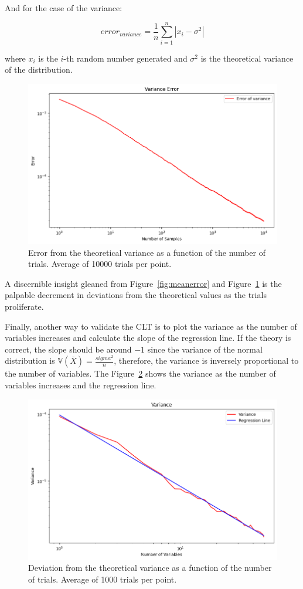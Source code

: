 \documentclass{article}
\begin{document}
And for the case of the variance:

\begin{equation*} error_{variance} = \frac{1}{n}\sum_{i=1}^{n} | x_i - \sigma^2 | \end{equation*}

where \(x_i\) is the \(i\)-th random number generated and \(\sigma^2\) is the theoretical variance of the distribution.

\begin{figure}[H]
	\centering
	\includegraphics[width=0.5\linewidth]{./Figures/CLT/varianceerror.png}
	\caption{Error from the theoretical variance as a function of the number of trials. Average of 10000 trials per point.}
	\label{fig:varianceerror}
\end{figure}

A discernible insight gleaned from Figure~\ref{fig:meanerror} and Figure~\ref{fig:varianceerror} is the palpable decrement in deviations from the theoretical values as the trials proliferate. 

Finally, another way to validate the CLT is to plot the variance as the number of variables increases and calculate the slope of the regression line. If the theory is correct, the slope should be around \(-1\) since the variance of the normal distribution is \(\mathbb{V}(\bar{X}) = \frac{sigma^2}{n}\), therefore, the variance is inversely proportional to the number of variables. The Figure~\ref{fig:variancereg} shows the variance as the number of variables increases and the regression line.


\begin{figure}[H]
	\centering
	\includegraphics[width=0.5\linewidth]{./Figures/CLT/varianceslope.png}
	\caption{Deviation from the theoretical variance as a function of the number of trials. Average of 1000 trials per point.}
	\label{fig:variancereg}
\end{figure}
\end{document}
